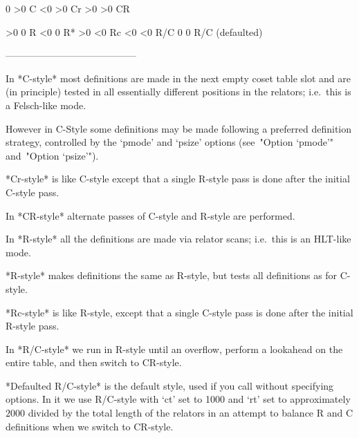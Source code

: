   0           >0         C
  <0           >0         Cr
  >0           >0         CR

  >0            0         R
  <0            0         R*
  >0           <0         Rc
  <0           <0         R/C
   0            0         R/C (defaulted)

-----------------------------------------
\endtt

In *C-style* most definitions are  made  in
the next empty coset table slot and are (in principle) tested  in  all
essentially different  positions  in  the  relators;  i.e.~this  is  a
Felsch-like mode.

However in C-Style some definitions may be made following a  preferred
definition strategy, controlled by the  `pmode'  and  `psize'  options
(see~"Option `pmode'" and~"Option `psize'").

*Cr-style* is like C-style except that  a
single R-style pass is done after the initial C-style pass.

In *CR-style* alternate passes of C-style
and R-style are performed.

In *R-style* all the definitions  are  made
via relator scans; i.e.~this is an HLT-like mode.

*R\*-style* makes definitions the  same
as R-style, but tests all definitions as for C-style.

*Rc-style* is like R-style, except that a
single C-style pass is done after the initial R-style pass.

In *R/C-style* we run in R-style  until
an overflow, perform a lookahead on the entire table, and then  switch
to CR-style.

*Defaulted     R/C-style* is the default style,  used  if  you  call  {\ACE}  without
specifying options. In it we use R/C-style with `ct' set to  1000  and
`rt' set to approximately $2000$ divided by the total  length  of  the
relators in an attempt to balance R and C definitions when  we  switch
to CR-style.



